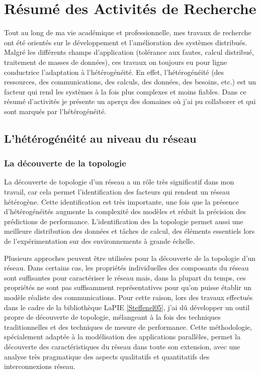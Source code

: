 \documentclass[a4paper]{book}
\begin{document}
\chapter{Résumé des Activités de Recherche}

Tout au long de ma vie académique et professionnelle, mes travaux de recherche ont été orientés sur le développement et l'amélioration des systèmes distribués. Malgré les différents champs d'application (tolérance aux fautes, calcul distribué, traitement de masses de données), ces travaux on toujours eu pour ligne conductrice l'adaptation à l'hétérogénéité. En effet, l'hétérogénéité (des ressources, des communications, des calculs, des données, des besoins, etc.) est un facteur qui rend les systèmes à la fois plus complexes et moins fiables. Dans ce résumé d'activités je présente un aperçu des domaines où j'ai pu collaborer et qui sont marqués par l'hétérogénéité. 

\section{L'hétérogénéité au niveau du réseau}

\subsection{La découverte de la topologie}

La découverte de topologie d'un réseau a un rôle très significatif dans mon travail, car cela permet l'identification des facteurs qui rendent un réseau hétérogène. Cette identification est très importante, une fois que la présence d'hétérogénéités augmente la complexité des modèles et réduit la précision des prédictions de performance. L'identification des la topologie permet aussi une meilleure distribution des données et tâches de calcul, des éléments essentiels lors de l'expérimentation sur des environnements à grande échelle. 

Plusieurs approches peuvent être utilisées pour la découverte de la topologie d'un réseau. Dans certains cas, les propriétés individuelles des composants du réseau sont suffisantes pour caractériser le réseau mais, dans la plupart du temps, ces propriétés ne sont pas suffisamment représentatives pour qu'on puisse établir un modèle réaliste des communications. Pour cette raison, lors des travaux effectués dans le cadre de la bibliothèque LaPIE \ref{Steffenel05}, j'ai dû développer un outil propre de découverte de topologie, mélangeant à la fois des techniques traditionnelles et des techniques de mesure de performance. Cette méthodologie, spécialement adaptée à la modélisation des applications parallèles, permet la découverte des caractéristiques du réseau dans toute son extension, avec une analyse très pragmatique des aspects qualitatifs et quantitatifs des interconnexions réseau.
\end{document}
